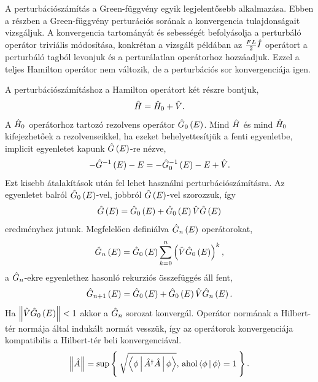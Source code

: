 A perturbációszámítás a Green-függvény egyik legjelentősebb alkalmazása. Ebben a részben a Green-függvény perturációs sorának a konvergencia tulajdonságait vizsgáljuk. A konvergencia tartományát és sebességét befolyásolja a perturbáló operátor triviális módosítása, konkrétan a vizsgált példában az $\frac{FL}{2}\hat{I}$ operátort a perturbáló tagból levonjuk és a perturálatlan operátorhoz hozzáadjuk. Ezzel a teljes Hamilton operátor nem változik, de a perturbációs sor konvergenciája igen.

A perturbációszámításhoz a Hamilton operátort két részre bontjuk,
\begin{equation}
	\hat{H} = \hat{H}_0 + \hat{V}.
\end{equation}
A $\hat{H}_0$ operátorhoz tartozó rezolvens operátor $\hat{G}_0\left(E\right)$. Mind $\hat{H}$ és mind $\hat{H}_0$ kifejezhetőek a rezolvenseikkel, ha ezeket behelyettesítjük a fenti egyenletbe, implicit egyenletet kapunk $\hat{G}\left(E\right)$-re nézve,
\begin{equation}
	-\hat{G}^{-1}\left(E\right) - E = -\hat{G}_0^{-1}\left(E\right) - E + \hat{V}.
\end{equation}
Ezt kisebb átalakítások után fel lehet használni perturbációszámításra. Az egyenletet balról $\hat{G}_0\left(E\right)$-vel, jobbról $\hat{G}\left(E\right)$-vel szorozzuk, így
\begin{equation}
	\hat{G}\left(E\right) = \hat{G}_0\left(E\right) + \hat{G}_0\left(E\right)\hat{V}\hat{G}\left(E\right)
	\label{green:pertmaster}
\end{equation}
eredményhez jutunk. Megfelelően definiálva $\hat{G}_n\left(E\right)$ operátorokat,
\begin{equation}
	\hat{G}_n\left(E\right) = \hat{G}_0\left(E\right)\sum_{k=0}^n\left(\hat{V}\hat{G}_0\left(E\right)\right)^k,
\end{equation}
a $\hat{G}_n$-ekre  egyenlethez hasonló rekurziós összefüggés áll fent,
\begin{equation}
	\hat{G}_{n+1}\left(E\right) = \hat{G}_0\left(E\right) + \hat{G}_0\left(E\right)\hat{V}\hat{G}_n\left(E\right).
	\label{perturbation:rekurzió}
\end{equation}
Ha $\left\lVert \hat{V}\hat{G}_0\left(E\right) \right\rVert < 1$ akkor a $\hat{G}_n$ sorozat konvergál. Operátor normának a Hilbert-tér normája által indukált normát vesszük, így az operátorok konvergenciája kompatibilis a Hilbert-tér beli konvergenciával.
\begin{equation}
	\left\lVert \hat{A} \right\rVert=\sup \Set{\sqrt{\Braket{\phi|\hat{A}^\dagger \hat{A}|\phi}} \text{, ahol} \Braket{\phi|\phi}=1}.
\end{equation}
